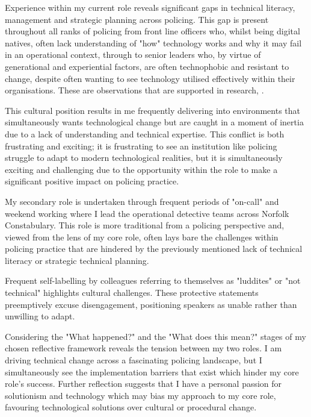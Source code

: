 \documentclass[12pt,a4paper,oneside]{report}
\begin{document}
Experience within my current role reveals significant gaps in technical literacy, management and strategic planning across policing.  This gap is present throughout all ranks of policing from front line officers who, whilst being digital natives, often lack understanding of "how" technology works and why it may fail in an operational context, through to senior leaders who, by virtue of generational and experiential factors, are often technophobic and resistant to change, despite often wanting to see technology utilised effectively within their organisations.  These are observations that are supported in research, \citep{laufs2022technological, kassem2025their}.

This cultural position results in me frequently delivering into environments that simultaneously wants technological change but are caught in a moment of inertia due to a lack of understanding and technical expertise.  This conflict is both frustrating and exciting; it is frustrating to see an institution like policing struggle to adapt to modern technological realities, but it is simultaneously exciting and challenging due to the opportunity within the role to make a significant positive impact on policing practice.

My secondary role is undertaken through frequent periods of "on-call" and weekend working where I lead the operational detective teams across Norfolk Constabulary.  This role is more traditional from a policing perspective and, viewed from the lens of my core role, often lays bare the challenges within policing practice that are hindered by the previously mentioned lack of technical literacy or strategic technical planning.

Frequent self-labelling by colleagues referring to themselves as "luddites" or "not technical" highlights cultural challenges. These protective statements preemptively excuse disengagement, positioning speakers as unable rather than unwilling to adapt.

Considering the "What happened?" and the "What does this mean?" stages of my chosen reflective framework reveals the tension between my two roles.  I am driving technical change across a fascinating policing landscape, but I simultaneously see the implementation barriers that exist which hinder my core role's success.    Further reflection suggests that I have a personal passion for solutionism and technology which may bias my approach to my core role, favouring technological solutions over cultural or procedural change.
\end{document}
